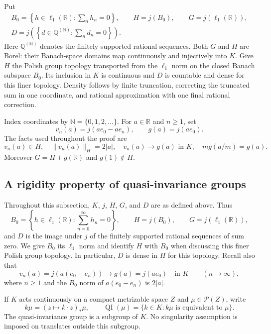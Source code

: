 \documentclass[11pt]{article}
\numberwithin{equation}{section}
\theoremstyle{definition}
\newcommand{\N}{\mathbb N}
\newcommand{\R}{\mathbb R}
\newcommand{\Q}{\mathbb Q}
\newcommand{\Prob}{\mathcal P}
\newcommand{\QI}{\operatorname{QI}}
\begin{document}
Put
\begin{gather*}
 B_0=\left\{h\in\ell_1(\R):\sum_n h_n=0\right\},
 \qquad H=j(B_0),\qquad G=j(\ell_1(\R)),\\
 D=j\left(\left\{d\in\Q^{(\N)}:\sum_n d_n=0\right\}\right).
\end{gather*}
Here $\Q^{(\N)}$ denotes the finitely supported rational sequences.
Both $G$ and $H$ are Borel: their Banach-space domains map continuously
and injectively into $K$. Give $H$ the Polish group topology transported
from the $\ell_1$ norm on the closed Banach subspace $B_0$.
Its inclusion in $K$ is continuous and $D$ is countable and dense for
this finer topology. Density follows by finite truncation, correcting
the truncated sum in one coordinate, and rational approximation with
one final rational correction.

Index coordinates by $\N=\{0,1,2,\ldots\}$. For $a\in\R$ and $n\ge1$,
set
\begin{equation}\label{eq:vn}
 v_n(a)=j(ae_0-ae_n),\qquad g(a)=j(ae_0).
\end{equation}
The facts used throughout the proof are
\begin{equation}\label{eq:group-facts}
 v_n(a)\in H,\quad \|v_n(a)\|_H=2|a|,\quad
 v_n(a)\longrightarrow g(a)\text{ in }K,\quad
 mg(a/m)=g(a).
\end{equation}
Moreover $G=H+g(\R)$ and $g(1)\notin H$.

\subsection{A rigidity property of quasi-invariance groups}
\label{sec:measure-obstruction}

Throughout this subsection, $K$, $j$, $H$, $G$, and $D$ are as defined
above. Thus
\[
 B_0=\left\{h\in\ell_1(\R):\sum_{n=0}^{\infty}h_n=0\right\},
 \qquad H=j(B_0),\qquad G=j(\ell_1(\R)),
\]
and $D$ is the image under $j$ of the finitely supported rational
sequences of sum zero. We give $B_0$ its $\ell_1$ norm and identify $H$
with $B_0$ when discussing this finer Polish group topology. In
particular, $D$ is dense in $H$ for this topology. Recall also that
\[
 v_n(a)=j(a(e_0-e_n))\longrightarrow g(a)=j(ae_0)
 \quad\text{in }K\qquad(n\longrightarrow\infty),
\]
where $n\geq1$ and the $B_0$ norm of $a(e_0-e_n)$ is $2|a|$.

If $K$ acts continuously on a compact metrizable space $Z$ and
$\mu\in\Prob(Z)$, write
\[
 k\mu=(z\mapsto k\cdot z)_*\mu,
 \qquad
 \QI(\mu)=\{k\in K:k\mu\text{ is equivalent to }\mu\}.
\]
The quasi-invariance group is a subgroup of $K$. No singularity
assumption is imposed on translates outside this subgroup.
\end{document}
